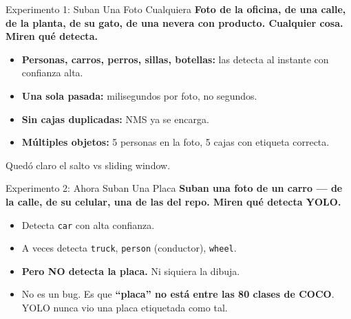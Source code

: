 \documentclass[aspectratio=169, 11pt]{beamer}
\begin{document}
\begin{frame}[shrink]{Experimento 1: Suban Una Foto Cualquiera}
  \vspace{6pt}
  {\footnotesize\color{arcaDark}\bfseries
    Foto de la oficina, de una calle, de la planta, de su gato, de
    una nevera con producto. Cualquier cosa. Miren qu\'e detecta.}

  \vspace{14pt}
  {\footnotesize
  \begin{itemize}\setlength{\itemsep}{6pt}
    \item[{\color{codeGreen}\scriptsize\faCheck}]
      \textbf{Personas, carros, perros, sillas, botellas:} las detecta
      al instante con confianza alta.
    \item[{\color{codeGreen}\scriptsize\faCheck}]
      \textbf{Una sola pasada:} milisegundos por foto, no segundos.
    \item[{\color{codeGreen}\scriptsize\faCheck}]
      \textbf{Sin cajas duplicadas:} NMS ya se encarga.
    \item[{\color{codeGreen}\scriptsize\faCheck}]
      \textbf{M\'ultiples objetos:} 5 personas en la foto, 5 cajas con etiqueta correcta.
  \end{itemize}
  }

  \vspace{8pt}
  \begin{tcolorbox}[colback=codeGreen!8, colframe=codeGreen, boxrule=0.5pt,
    arc=2pt, left=6pt, right=6pt, top=4pt, bottom=4pt]
    {\scriptsize\color{arcaDark}
    \faKey\hspace{4pt} Qued\'o claro el salto vs sliding window.}
  \end{tcolorbox}
\end{frame}

\begin{frame}[shrink]{Experimento 2: Ahora Suban Una Placa}
  \vspace{6pt}
  {\footnotesize\color{arcaDark}\bfseries
    Suban una foto de un carro --- de la calle, de su celular,
    una de las del repo. Miren qu\'e detecta YOLO.}

  \vspace{14pt}
  {\footnotesize
  \begin{itemize}\setlength{\itemsep}{6pt}
    \item[{\color{codeGreen}\scriptsize\faCheck}]
      Detecta \texttt{car} con alta confianza.
    \item[{\color{codeGreen}\scriptsize\faCheck}]
      A veces detecta \texttt{truck}, \texttt{person} (conductor), \texttt{wheel}.
    \item[{\color{arcaRed}\scriptsize\faTimes}]
      \textbf{Pero NO detecta la placa.} Ni siquiera la dibuja.
    \item[{\color{arcaRed}\scriptsize\faTimes}]
      No es un bug. Es que \textbf{``placa'' no est\'a entre las 80 clases de COCO}.
      YOLO nunca vio una placa etiquetada como tal.
  \end{itemize}
  }
\end{frame}
\end{document}
